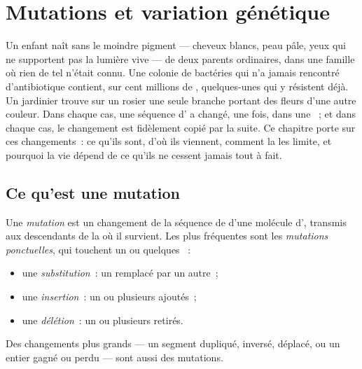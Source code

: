 \chapter{Mutations et variation génétique}\label{ch:g11:mutations}

Un enfant naît sans le moindre pigment --- cheveux blancs, peau pâle,
yeux qui ne supportent pas la lumière vive --- de deux parents
ordinaires, dans une famille où rien de tel n'était connu. Une colonie
de bactéries qui n'a jamais rencontré d'antibiotique contient, sur cent
millions de , quelques-unes qui y résistent déjà. Un jardinier
trouve sur un rosier une seule branche portant des fleurs d'une autre
couleur. Dans chaque cas, une séquence d' a changé, une fois, dans
une ~; et dans chaque cas, le changement est fidèlement copié
par la suite. Ce chapitre porte sur ces changements~: ce qu'ils sont,
d'où ils viennent, comment la  les limite, et pourquoi la vie
dépend de ce qu'ils ne cessent jamais tout à fait.

\section{Ce qu'est une mutation}

\begin{definition}[Mutation]\label{def:g11:mutations:mutation}
Une \emph{mutation} est un changement de la séquence de
 d'une molécule d', transmis aux descendants de la
 où il survient. Les plus fréquentes sont les
\emph{mutations ponctuelles}, qui touchent un ou quelques
~:
\begin{itemize}
  \item une \emph{substitution}~: un  remplacé par un autre~;
  \item une \emph{insertion}~: un ou plusieurs  ajoutés~;
  \item une \emph{délétion}~: un ou plusieurs  retirés.
\end{itemize}
Des changements plus grands --- un segment dupliqué, inversé, déplacé,
ou un  entier gagné ou perdu --- sont aussi des mutations.
\end{definition}

